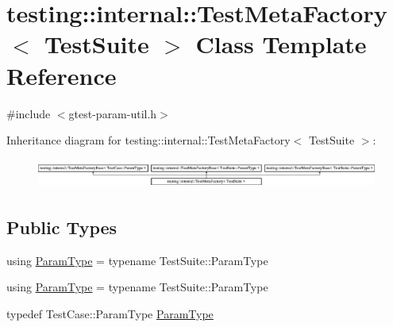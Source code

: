 \hypertarget{classtesting_1_1internal_1_1_test_meta_factory}{}\section{testing\+::internal\+::Test\+Meta\+Factory$<$ Test\+Suite $>$ Class Template Reference}
\label{classtesting_1_1internal_1_1_test_meta_factory}


{\ttfamily \#include $<$gtest-\/param-\/util.\+h$>$}

Inheritance diagram for testing\+::internal\+::Test\+Meta\+Factory$<$ Test\+Suite $>$\+:\begin{figure}[H]
\begin{center}
\leavevmode
\includegraphics[height=0.985048cm]{dc/d6b/classtesting_1_1internal_1_1_test_meta_factory}
\end{center}
\end{figure}
\subsection*{Public Types}
\begin{DoxyCompactItemize}
\item 
using \mbox{\hyperlink{classtesting_1_1internal_1_1_test_meta_factory_a392ebab15dfdcfa1b54bbe15878aa9cd}{Param\+Type}} = typename Test\+Suite\+::\+Param\+Type
\item 
using \mbox{\hyperlink{classtesting_1_1internal_1_1_test_meta_factory_a392ebab15dfdcfa1b54bbe15878aa9cd}{Param\+Type}} = typename Test\+Suite\+::\+Param\+Type
\item 
typedef Test\+Case\+::\+Param\+Type \mbox{\hyperlink{classtesting_1_1internal_1_1_test_meta_factory_a26bf7dd042fd5f4be3d626d127d0dd2b}{Param\+Type}}
\end{DoxyCompactItemize}
